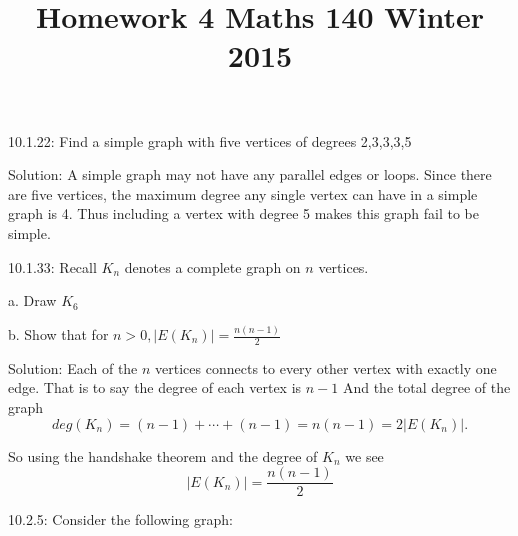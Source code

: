 \documentclass[16 pt]{amsart}
\theoremstyle{definition}
\theoremstyle{remark}
\numberwithin{equation}{subsection}
\begin{document}
\title{Homework 4 Maths 140 Winter 2015}
\maketitle 


10.1.22: Find a simple graph with five vertices of degrees 2,3,3,3,5

\vspace{1in}

Solution: A simple graph may not have any parallel edges or loops.  Since there are five vertices, the maximum degree any single vertex can have in a simple graph is 4.  Thus including a vertex with degree 5 makes this graph fail to be simple.


\newpage



10.1.33: Recall $K_n$ denotes a complete graph on $n$ vertices. 

a. Draw $K_6$

\vspace{.5in}







\vspace{.5in}


b. Show that for $n>0, |E(K_n)| = \frac{n(n-1)}{2}$

\vspace{.5in}

Solution:  Each of the $n$ vertices connects to every other vertex with exactly one edge.  That is to say the degree of each vertex is $n-1$ And the total degree of the graph
\[
deg(K_n) = (n-1)+\cdots +(n-1) = n(n-1) = 2 |E(K_n)|.
\]


So using the handshake theorem and the degree of $K_n$ we see
\[
|E(K_n)| = \frac{n(n-1)}{2}
\]

\newpage



10.2.5: Consider the following graph:

\end{document}
